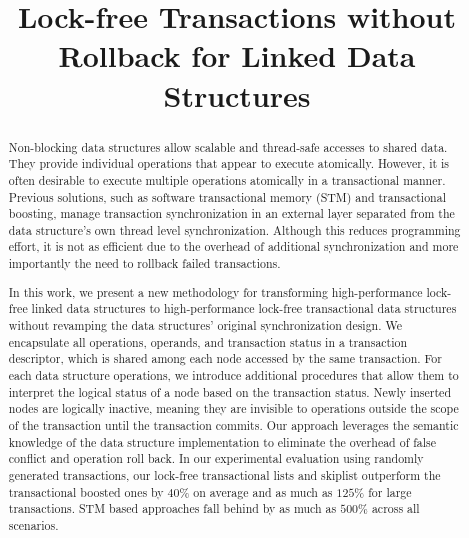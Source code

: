 \documentclass[10pt,conference,compsocconf]{IEEEtran}
\begin{document}
\title{Lock-free Transactions without Rollback for Linked Data Structures}

\author{
}

\maketitle

\begin{abstract}
    Non-blocking data structures allow scalable and thread-safe accesses to shared data. 
    They provide individual operations that appear to execute atomically.
    However, it is often desirable to execute multiple operations atomically in a transactional manner.
    Previous solutions, such as software transactional memory (STM) and transactional boosting, manage transaction synchronization in an external layer separated from the data structure's own thread level synchronization.
    Although this reduces programming effort, it is not as efficient due to the overhead of additional synchronization and more importantly the need to rollback failed transactions.
    
    In this work, we present a new methodology for transforming high-performance lock-free linked data structures to high-performance lock-free transactional data structures without revamping the data structures' original synchronization design.
    We encapsulate all operations, operands, and transaction status in a transaction descriptor, which is shared among each node accessed by the same transaction.
    For each data structure operations, we introduce additional procedures that allow them to interpret the logical status of a node based on the transaction status. 
    Newly inserted nodes are logically inactive, meaning they are invisible to operations outside the scope of the transaction until the transaction commits.
    Our approach leverages the semantic knowledge of the data structure implementation to eliminate the overhead of false conflict and operation roll back.
    In our experimental evaluation using randomly generated transactions, our lock-free transactional lists and skiplist outperform the transactional boosted ones by $40\%$ on average and as much as $125\%$ for large transactions.
    STM based approaches fall behind by as much as $500\%$ across all scenarios.
\end{abstract}
\end{document}
